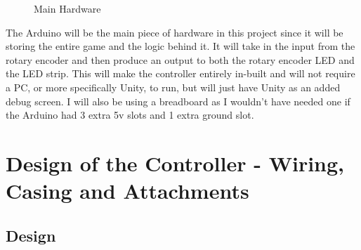 \documentclass{article}
\begin{document}
\begin{figure}[ht]%
    \centering
    \qquad
    \caption{Main Hardware}%
    \label{fig:main_hardware}%
\end{figure}

The Arduino will be the main piece of hardware in this project since it will be storing the entire game and the logic behind it. It will take in the input from the rotary encoder and then produce an output to both the rotary encoder LED and the LED strip. This will make the controller entirely in-built and will not require a PC, or more specifically Unity, to run, but will just have Unity as an added debug screen. I will also be using a breadboard as I wouldn't have needed one if the Arduino had 3 extra 5v slots and 1 extra ground slot.

\section{Design of the Controller - Wiring, Casing and Attachments}
\subsection{Design}
\end{document}
